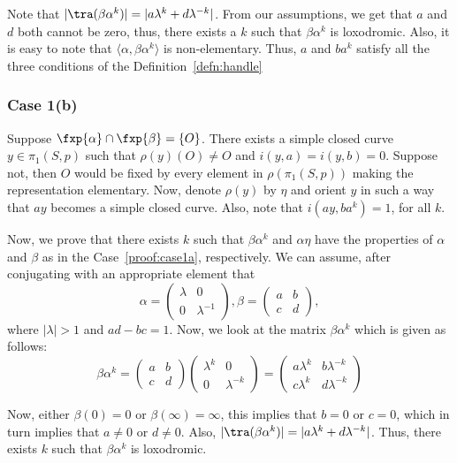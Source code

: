 Note that $|\tra(\beta \alpha^k)| = |a \lambda^k + d \lambda^{-k}|$. From our assumptions, we get that $a$ and $d$ both cannot be zero, thus, there exists a $k$ such that $\beta \alpha^k$ is loxodromic. Also, it is easy to note that $\langle \alpha, \beta \alpha^k \rangle$ is non-elementary. Thus, $a$ and $b a^k$ satisfy all the three conditions of the Definition~\ref{defn:handle}

\subsubsection{Case 1(b)} \label{proof:case1b} Suppose $\fxp{\alpha} \cap \fxp{\beta} = \{O\}$. There exists a simple closed curve $y \in \pi_1(S,p)$ such that $\rho(y)(O) \neq O$ and $i(y,a)= i(y,b) = 0$. Suppose not, then $O$ would be fixed by every element in $\rho(\pi_1(S, p))$ making the representation elementary. Now, denote $\rho(y) $ by $\eta$ and orient $y$ in such a way that $ay$ becomes a simple closed curve. Also, note that $i(ay, ba^k) = 1$, for all $k$. 

Now, we prove that there exists $k$ such that $\beta \alpha^k$ and $\alpha \eta$ have the properties of $\alpha$ and $\beta$ as in the Case~\ref{proof:case1a}, respectively. We can assume, after conjugating with an appropriate element that 
\[\alpha = \begin{pmatrix}
	\lambda & 0 \\
	0 & \lambda^{-1}
\end{pmatrix}, 
\beta = \begin{pmatrix}
	a & b\\
	c & d
\end{pmatrix},\]
where $|\lambda|>1$ and $ad - bc = 1$. Now, we look at the matrix $\beta \alpha^k$ which is given as follows:
\[\beta \alpha^k = 
\begin{pmatrix}
	a & b\\
	c & d
\end{pmatrix} 
\begin{pmatrix}
	\lambda^k & 0 \\
	0 & \lambda^{-k}
\end{pmatrix} = 
\begin{pmatrix}
	a \lambda^k & b \lambda^{-k} \\
	c \lambda^k & d \lambda^{-k}
\end{pmatrix}
\]

Now, either $\beta(0) = 0$ or $\beta(\infty)=\infty$, this implies that $b = 0$ or $c = 0$, which in turn implies that $a \neq 0$ or $d \neq 0$. Also, $|\tra(\beta \alpha^k)| = |a \lambda^k + d \lambda^{-k}|$. Thus, there exists $k$ such that $\beta \alpha^k$ is loxodromic.

